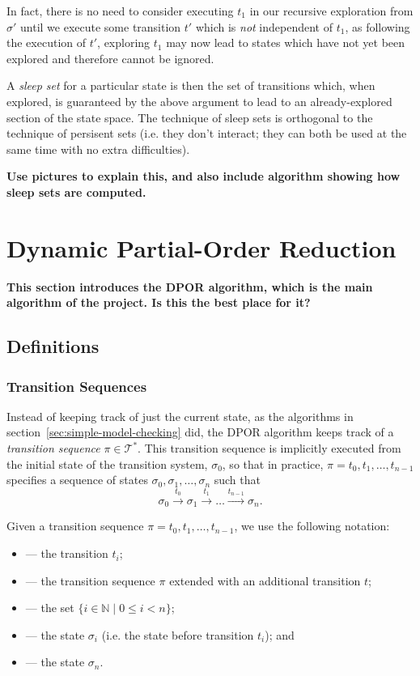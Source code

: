 \documentclass[12pt,a4paper,twoside,openright]{report}
\begin{document}
In fact, there is no need to consider executing
$t_1$ in our recursive exploration from $\sigma'$
until we execute some transition $t'$ which is
\emph{not} independent of $t_1$, as following
the execution of $t'$, exploring $t_1$ may
now lead to states which have not yet been
explored and therefore cannot be ignored.

A \emph{sleep set} for a particular state
is then the set of transitions which, when
explored, is guaranteed by the above
argument to lead to an already-explored
section of the state space. The technique of
sleep sets is orthogonal to the technique
of persisent sets (i.e. they don't interact;
they can both be used at the same time
with no extra difficulties).

\textbf{Use pictures to explain this,
and also include algorithm showing how
sleep sets are computed.}

\section{Dynamic Partial-Order Reduction}
\textbf{This section introduces the DPOR
	algorithm, which is the main algorithm
	of the project.	
	Is this the best place for it?}

\subsection{Definitions}

\subsubsection{Transition Sequences}
Instead of keeping track of just the current state, as
the algorithms in section~\ref{sec:simple-model-checking}
did, the DPOR algorithm keeps track of a \emph{transition
sequence} $\pi \in \mathcal{T}^*$. This transition
sequence is implicitly executed from the initial state of
the transition system, $\sigma_0$, so that in practice,
$\pi = t_0, t_1, \ldots, t_{n-1}$ specifies a sequence of states
$\sigma_0, \sigma_1, \ldots, \sigma_n$ such that
\[
	\sigma_0 \xrightarrow{\ t_0\ } \sigma_1 \xrightarrow{\ t_1\ }
	\ldots \xrightarrow{t_{n-1}} \sigma_n.
\]

Given a transition sequence $\pi = t_0, t_1, \ldots, t_{n-1}$,
we use the following notation:
\begin{itemize}[label={}]
	\newcommand{\defsindent}{3.5em}
	\item{\makebox[\defsindent]{\hfill$\pi_i$}
		--- the transition $t_i$;}
	\item{\makebox[\defsindent]{\hfill$\pi.t$}
		--- the transition sequence $\pi$ extended with
		an additional transition $t$;}
	\item{\makebox[\defsindent]{\hfill$\textit{dom}(\pi)$}
		--- the set $\{i \in \mathbb{N} \mid 0 \leq i < n \}$;}
	\item{\makebox[\defsindent]{\hfill$\textit{pre}(\pi, i)$}
		--- the state $\sigma_i$ (i.e. the state before transition $t_i$); and}
	\item{\makebox[\defsindent]{\hfill$\textit{last}(\pi)$}
		--- the state $\sigma_n$.}
\end{itemize}
\end{document}
